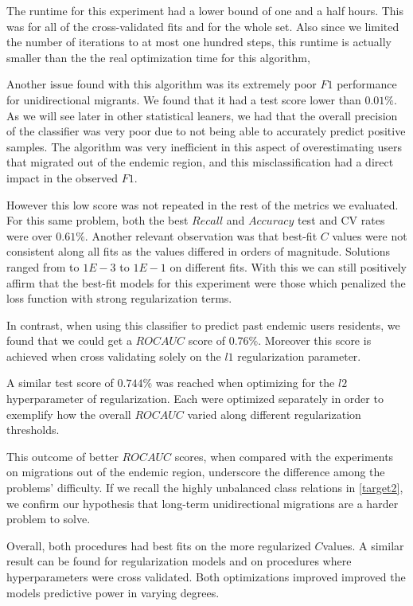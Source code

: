 The runtime for this experiment had a lower bound of one and a half hours.
This was for all of the cross-validated fits and for the whole set.
Also since we limited the number of iterations to at most one hundred steps, this runtime is actually smaller than the the real optimization time for this algorithm, 

Another issue found with this algorithm was its extremely poor $F1$ performance for unidirectional migrants. 
We found that it had a test score lower than $0.01\%$.
As we will see later in other statistical leaners, we had that
the overall precision of the classifier was very poor due to not being able to accurately predict positive samples.
The algorithm was very inefficient in this aspect of overestimating users that migrated out of the endemic region, and this misclassification had a direct impact in the observed $F1$.


However this low score was not repeated in the rest of the metrics we evaluated.
For this same problem, both the best $Recall$ and $Accuracy$ test and CV rates were over $0.61\%$.
Another relevant observation was that best-fit $C$ values were not consistent along all fits as the values differed in orders of magnitude.
Solutions ranged from to $1E-3$ to $1E-1$ on different fits.
With this we can still positively affirm that the best-fit models for this experiment were those which penalized the loss function with strong regularization terms.


In contrast, when using this classifier to predict past endemic users residents, we found that we could get a $ROC AUC$ score of $0.76\%$.
Moreover this score is achieved when cross validating solely on the $l1$ regularization parameter.

A similar test score of $0.744\%$ was reached when optimizing for the $l2$ hyperparameter of regularization.
Each were optimized separately in order to exemplify how the overall $ROC AUC$ varied along different regularization thresholds.

This outcome of better $ROC AUC$ scores, when compared with the experiments on migrations out of the endemic region, underscore the difference among the problems' difficulty.
If we recall the highly unbalanced class relations in \cref{target2}, we confirm our hypothesis that long-term unidirectional migrations are a harder problem to solve.

Overall, both procedures had best fits on the more regularized $C$values.
A similar result can be found for regularization models and on procedures where hyperparameters were cross validated.
Both optimizations improved improved the models predictive power in varying degrees.


